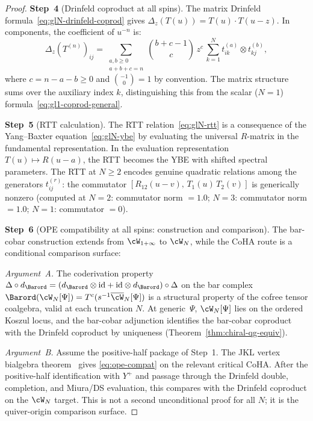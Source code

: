 \begin{proof}
\medskip
\noindent
\textbf{Step~4}
(Drinfeld coproduct at all spins).
The matrix Drinfeld
formula~\eqref{eq:glN-drinfeld-coprod} gives
$\Delta_z(T(u)) = T(u) \cdot T(u - z)$. In components,
the coefficient of $u^{-n}$ is:
\[
 \Delta_z(T^{(n)})_{ij}
 = \sum_{\substack{a,b \geq 0 \\ a+b+c = n}}
 \binom{b+c-1}{c}\, z^c\,
 \sum_{k=1}^{N}
 t_{ik}^{(a)} \otimes t_{kj}^{(b)},
\]
where $c = n - a - b \geq 0$ and
$\binom{-1}{0} = 1$ by convention. The matrix structure
sums over the auxiliary index $k$, distinguishing this from
the scalar ($N = 1$) formula~\eqref{eq:gl1-coprod-general}.

\medskip
\noindent
\textbf{Step~5}
(RTT calculation).
The RTT relation~\eqref{eq:glN-rtt} is a consequence of
the Yang--Baxter equation~\eqref{eq:glN-ybe} by
evaluating the universal $R$-matrix in the
fundamental representation. In the evaluation
representation $T(u) \mapsto R(u - a)$, the RTT becomes
the YBE with shifted spectral parameters.
The RTT at
$N \geq 2$ encodes genuine quadratic relations among the
generators $t_{ij}^{(r)}$: the commutator
$[R_{12}(u-v),\, T_1(u)\, T_2(v)]$ is generically nonzero
(computed at $N = 2$: commutator norm $= 1.0$;
$N = 3$: commutator norm $= 1.0$;
$N = 1$: commutator $= 0$).

\medskip
\noindent
\textbf{Step~6}
(OPE compatibility at all spins: construction and comparison).
The bar-cobar construction extends from $\cW_{1+\infty}$ to
$\cW_N$, while the CoHA route is a conditional comparison surface:

\smallskip
\noindent\emph{Argument~A.}
The coderivation property
$\Delta \circ d_{\Barord}
= (d_{\Barord}\otimes\id+\id\otimes d_{\Barord})\circ\Delta$
on the bar complex $\Barord(\cW_N[\Psi])
= T^c(s^{-1}\overline{\cW}_N[\Psi])$
is a structural property of the cofree tensor coalgebra,
valid at each truncation $N$. At generic~$\Psi$,
$\cW_N[\Psi]$ lies on the ordered Koszul locus, and the
bar-cobar adjunction identifies the bar-cobar coproduct
with the Drinfeld coproduct by uniqueness
(Theorem~\ref{thm:chiral-qg-equiv}).

\smallskip
\noindent\emph{Argument~B.}
Assume the positive-half package of Step~1. The JKL vertex
bialgebra theorem~\cite{JKL26} gives
\eqref{eq:ope-compat} on the relevant critical CoHA. After the
positive-half identification with $Y^+$ and passage through the
Drinfeld double, completion, and Miura/DS evaluation, this
compares with the Drinfeld coproduct on the \(\cW_N\) target.
This is not a second unconditional proof for all $N$; it is the
quiver-origin comparison surface.


\end{proof}
